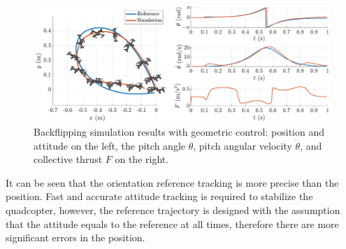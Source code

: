 \begin{figure}
    \centering
    \includegraphics[width=\linewidth]{Fig/geomsimu.pdf}
    \caption{Backflipping simulation results with geometric control: position and attitude on the left, the pitch angle $\theta$, pitch angular velocity $\dot{\theta}$, and collective thrust $F$ on the right.}\label{fig:geomsimu}
    \end{figure}
 
 It can be seen that the orientation reference tracking is more precise than the position. Fast and accurate attitude tracking is required to stabilize the quadcopter, however, the reference trajectory is designed with the assumption that the attitude equals to the reference at all times, therefore there are more significant errors in the position.
 
 
